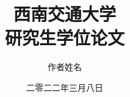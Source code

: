 \documentclass[master]{swjtuthesis}
\title{西南交通大学\\研究生学位论文}
\author{作者姓名}
\date{二零二二年三月八日}
\begin{document}
\begingroup
\let\cleardoublepage\clearpage
\maketitle

\frontmatter


\tableofcontents

\mainmatter




\appendix

\backmatter




\endgroup
\end{document}
